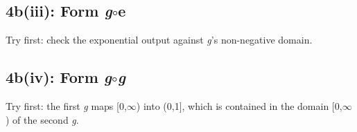 \documentclass[11pt]{article}
\begin{document}
\begin{keepsection}
\begin{keepsection}
\end{keepsection}

\begin{keepsection}
\subsection{4b(iii): Form \textit{g}\ensuremath{\circ}e}

Try first: check the exponential output against \textit{g}’s non-negative domain.

\end{keepsection}

\begin{keepsection}
\subsection{4b(iv): Form \textit{g}\ensuremath{\circ}\textit{g}}

Try first: the first \textit{g} maps [0,\ensuremath{\infty}) into (0,1], which is contained in the domain [0,\ensuremath{\infty}) of the second \textit{g}.

\end{keepsection}
\end{keepsection}
\end{document}
